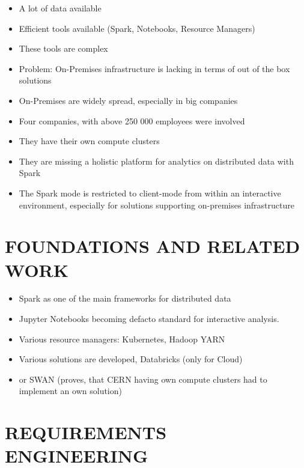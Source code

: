 \documentclass[a4paper,twoside]{article}
\begin{document}
\begin{itemize}
    \item A lot of data available
    \item Efficient tools available (Spark, Notebooks, Resource Managers)
    \item These tools are complex
    \item Problem: On-Premises infrastructure is lacking in terms of out of the box solutions
    \item On-Premises are widely spread, especially in big companies
    \item Four companies, with above 250 000 employees were involved
    \item They have their own compute clusters
    \item They are missing a holistic platform for analytics on distributed data with Spark
    \item The Spark mode is restricted to client-mode from within an interactive environment, especially for solutions supporting on-premises infrastructure
\end{itemize}

\section{\uppercase{Foundations and related work}}

\begin{itemize}
    \item Spark as one of the main frameworks for distributed data
    \item Jupyter Notebooks becoming defacto standard for interactive analysis. 
    \item Various resource managers: Kubernetes, Hadoop YARN
    \item Various solutions are developed, Databricks (only for Cloud)
    \item or SWAN (proves, that CERN having own compute clusters had to implement an own solution)
\end{itemize}


\section{\uppercase{Requirements Engineering}}
\end{document}
